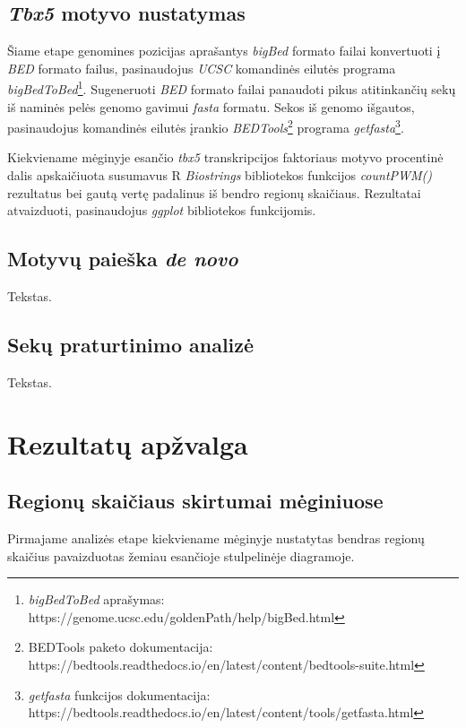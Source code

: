 \documentclass[12pt]{article}
\begin{document}
\subsection{\emph{Tbx5} motyvo nustatymas}
Šiame etape genomines pozicijas aprašantys \emph{bigBed} formato
failai konvertuoti į \emph{BED} formato failus, pasinaudojus
\emph{UCSC} komandinės eilutės programa \emph{bigBedToBed}\footnote[1]
{\emph{bigBedToBed} aprašymas: 
https://genome.ucsc.edu/goldenPath/help/bigBed.html}.
Sugeneruoti \emph{BED} formato failai panaudoti pikus atitinkančių
sekų iš naminės pelės genomo gavimui \emph{fasta} formatu.
Sekos iš genomo išgautos, pasinaudojus komandinės eilutės įrankio
\emph{BEDTools}\footnote[2]{BEDTools paketo
dokumentacija: 
https://bedtools.readthedocs.io/en/latest/content/bedtools-suite.html}
programa \emph{getfasta}\footnote[3]{\emph{getfasta} funkcijos
dokumentacija: 
https://bedtools.readthedocs.io/en/latest/content/tools/getfasta.html}.

Kiekviename mėginyje esančio \emph{tbx5} transkripcijos faktoriaus
motyvo procentinė dalis apskaičiuota susumavus R \emph{Biostrings}
bibliotekos funkcijos \emph{countPWM()} rezultatus bei gautą
vertę padalinus iš bendro regionų skaičiaus.
Rezultatai atvaizduoti, pasinaudojus \emph{ggplot} bibliotekos
funkcijomis.

\subsection{Motyvų paieška \emph{de novo}}
Tekstas.

\subsection{Sekų praturtinimo analizė}
Tekstas.

\newpage


\section{Rezultatų apžvalga}
\subsection{Regionų skaičiaus skirtumai mėginiuose}
Pirmajame analizės etape kiekviename mėginyje nustatytas bendras
regionų skaičius pavaizduotas žemiau esančioje stulpelinėje
diagramoje.
\end{document}
